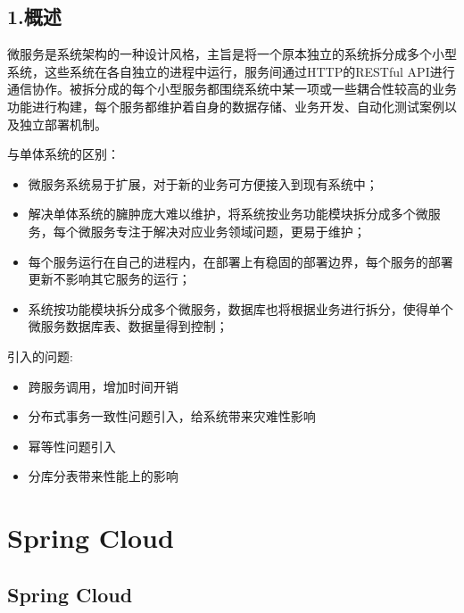 \documentclass[letterpaper,10pt,english]{sphinxmanual}
\begin{document}
\subsection{1.概述}
\label{\detokenize{00.summary/summary_01:id1}}\label{\detokenize{00.summary/summary_01::doc}}
微服务是系统架构的一种设计风格，主旨是将一个原本独立的系统拆分成多个小型系统，这些系统在各自独立的进程中运行，服务间通过HTTP的RESTful API进行通信协作。被拆分成的每个小型服务都围绕系统中某一项或一些耦合性较高的业务功能进行构建，每个服务都维护着自身的数据存储、业务开发、自动化测试案例以及独立部署机制。

与单体系统的区别：
\begin{itemize}
\item {} 
微服务系统易于扩展，对于新的业务可方便接入到现有系统中；

\item {} 
解决单体系统的臃肿庞大难以维护，将系统按业务功能模块拆分成多个微服务，每个微服务专注于解决对应业务领域问题，更易于维护；

\item {} 
每个服务运行在自己的进程内，在部署上有稳固的部署边界，每个服务的部署更新不影响其它服务的运行；

\item {} 
系统按功能模块拆分成多个微服务，数据库也将根据业务进行拆分，使得单个微服务数据库表、数据量得到控制；

\end{itemize}

引入的问题:
\begin{itemize}
\item {} 
跨服务调用，增加时间开销

\item {} 
分布式事务一致性问题引入，给系统带来灾难性影响

\item {} 
幂等性问题引入

\item {} 
分库分表带来性能上的影响

\end{itemize}


\section{Spring Cloud}
\label{\detokenize{01.spring-cloud/spring-cloud:spring-cloud}}\label{\detokenize{01.spring-cloud/spring-cloud::doc}}

\subsection{Spring Cloud}
\label{\detokenize{01.spring-cloud/01.introduction/introduction:spring-cloud}}\label{\detokenize{01.spring-cloud/01.introduction/introduction::doc}}
\end{document}
